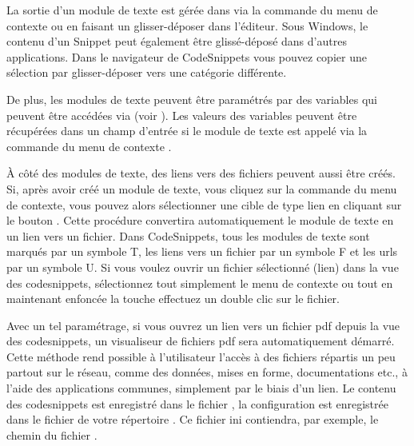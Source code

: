 
La sortie d'un module de texte est gérée dans \codeblocks via la commande  du menu de contexte ou en faisant un glisser-déposer dans l'éditeur. Sous Windows, le contenu d'un Snippet peut également être glissé-déposé dans d'autres applications. Dans le navigateur de CodeSnippets vous pouvez copier une sélection par glisser-déposer vers une catégorie différente.

De plus, les modules de texte peuvent être paramétrés par des variables  qui peuvent être accédées via   (voir ). Les valeurs des variables peuvent être récupérées dans un champ d'entrée si le module de texte est appelé via la commande du menu de contexte .

À côté des modules de texte, des liens vers des fichiers peuvent aussi être créés. Si, après avoir créé un module de texte, vous cliquez sur la commande  du menu de contexte, vous pouvez alors sélectionner une cible de type lien en cliquant sur le bouton . Cette procédure convertira automatiquement le module de texte en un lien vers un fichier. Dans CodeSnippets, tous les modules de texte sont marqués par un symbole T, les liens vers un fichier par un symbole F et les urls par un symbole U. Si vous voulez ouvrir un fichier sélectionné (lien) dans la vue des codesnippets, sélectionnez tout simplement le menu de contexte  ou tout en maintenant enfoncée la touche  effectuez un double clic sur le fichier.


Avec un tel paramétrage, si vous ouvrez un lien vers un fichier pdf depuis la vue des codesnippets, un visualiseur de fichiers pdf sera automatiquement démarré. Cette méthode rend possible à l'utilisateur l'accès à des fichiers répartis un peu partout sur le réseau, comme des données, mises en forme, documentations etc., à l'aide des applications communes, simplement par le biais d'un lien. Le contenu des codesnippets est enregistré dans le fichier , la configuration est enregistrée dans le fichier  de votre répertoire . Ce fichier ini contiendra, par exemple, le chemin du fichier .


